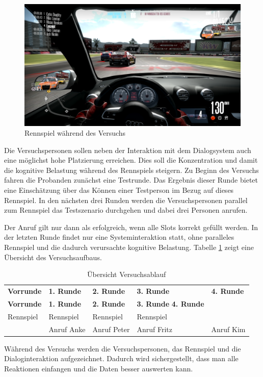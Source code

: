\documentclass[12pt,a4paper]{scrartcl}
\begin{document}
\begin{figure}[H]
\begin{center}
\includegraphics[width=14cm]{nfs.png}
\caption{Rennspiel während des Versuchs}
\label{nfsss}
\end{center}
\end{figure}

Die Versuchspersonen sollen neben der Interaktion mit dem Dialogsystem auch eine möglichst hohe Platzierung erreichen. Dies soll die Konzentration und damit die kognitive Belastung während des Rennspiels steigern. Zu Beginn des Versuchs fahren die Probanden zunächst eine Testrunde. Das Ergebnis dieser Runde bietet eine Einschätzung über das Können einer Testperson im Bezug auf dieses Rennspiel. In den nächsten drei Runden werden die Versuchspersonen parallel zum Rennspiel das Testszenario durchgehen und dabei drei Personen anrufen. 

 Der Anruf gilt nur dann als erfolgreich, wenn alle Slots korrekt gefüllt werden. 
In der letzten Runde findet nur eine Systeminteraktion statt, ohne paralleles Rennspiel und die dadurch verursachte kognitive Belastung. 
Tabelle \ref{ablauf1} zeigt eine Übersicht des Versuchsaufbaus.

\begin{longtable}{p{}p{}p{}p{}p{} }
	\label{ablauf1}\\
	\caption[Übersicht Versuchsablauf]{Übersicht Versuchsablauf}\\
	\hline
	\textbf{Vorrunde}&\textbf{1. Runde}&\textbf{2. Runde} &\textbf{3. Runde} & \textbf{4. Runde}\\
	\hline
	\endfirsthead
	\hline
	\textbf{Vorrunde}&\textbf{1. Runde}&\textbf{2. Runde} &\textbf{3. Runde} \textbf{4. Runde}\\
	\hline
	\endhead
Rennspiel & Rennspiel & Rennspiel & Rennspiel &\\
 & Anruf Anke & Anruf Peter & Anruf Fritz & Anruf Kim \\
\hline
\end{longtable}
Während des Versuchs werden die Versuchspersonen, das Rennspiel und die Dialoginteraktion aufgezeichnet. Dadurch wird sichergestellt, dass man alle Reaktionen einfangen und die Daten besser auswerten kann. 
\end{document}
